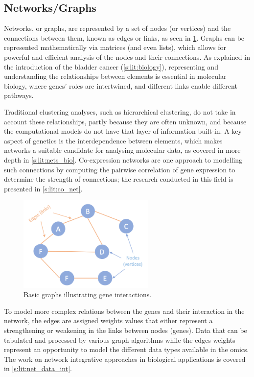 \subsection{Networks/Graphs} \label{s:lit:graph_overview}

Networks, or graphs, are represented by a set of nodes (or vertices) and the connections between them, known as edges or links, as seen in \cref{fig:graphs_basic}. Graphs can be represented mathematically via matrices (and even lists), which allows for powerful and efficient analysis of the nodes and their connections. As explained in the introduction of the bladder cancer (\cref{s:lit:biology}), representing and understanding the relationships between elements is essential in molecular biology, where genes' roles are intertwined, and different links enable different pathways.

Traditional clustering analyses, such as hierarchical clustering, do not take in account these relationships, partly because they are often unknown, and because the computational models do not have that layer of information built-in. A key aspect of genetics is the interdependence between elements, which makes networks a suitable candidate for analysing molecular data, as covered in more depth in \cref{s:lit:nets_bio}. Co-expression networks are one approach to modelling such connections by computing the pairwise correlation of gene expression to determine the strength of connections; the research conducted in this field is presented in \cref{s:lit:co_net}.

\begin{figure}[!t]
  \centering\includegraphics[width=0.6\textwidth,keepaspectratio]{Sections/Lit_review/Resources/basic_graphs.png}
    \caption[Basic graph]{Basic graphs illustrating gene interactions.}
    \label{fig:graphs_basic}
\end{figure}

To model more complex relations between the genes and their interaction in the network, the edges are assigned weights values that either represent a strengthening or weakening in the links between nodes (genes). Data that can be tabulated and processed by various graph algorithms while the edges weights represent an opportunity to model the different data types available in the omics. The work on network integrative approaches in biological applications is covered in \cref{s:lit:net_data_int}.

